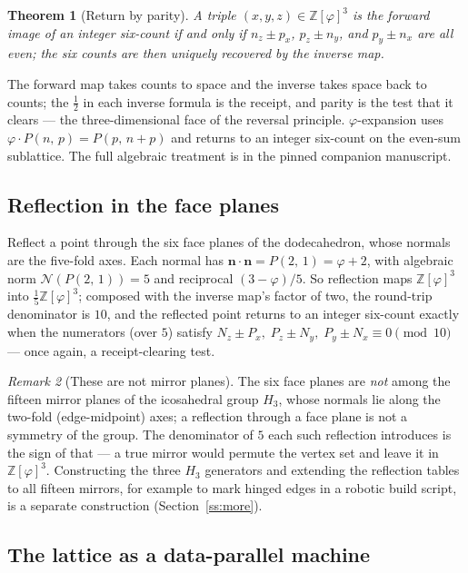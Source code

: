 \documentclass[11pt]{article}
\newtheorem{theorem}{Theorem}[section]
\theoremstyle{definition}
\theoremstyle{remark}
\newtheorem{remark}[theorem]{Remark}
\newcommand{\Zphi}{\mathbb{Z}[\varphi]}
\newcommand{\Pb}[2]{P(#1,\,#2)}
\newcommand{\Norm}{\mathcal{N}}
\begin{document}
\begin{theorem}[Return by parity]
\label{thm:parity}
A triple $(x,y,z)\in\Zphi^3$ is the forward image of an integer six-count if and
only if $n_z\pm p_x$, $p_z\pm n_y$, and $p_y\pm n_x$ are all even; the six counts
are then uniquely recovered by the inverse map.
\end{theorem}

The forward map takes counts to space and the inverse takes space back to counts;
the $\tfrac12$ in each inverse formula is the receipt, and parity is the test that
it clears --- the three-dimensional face of the reversal principle.
$\varphi$-expansion uses $\varphi\cdot\Pb{n}{p}=\Pb{p}{n+p}$ and returns to an
integer six-count on the even-sum sublattice. The full algebraic treatment is in
the pinned companion manuscript.

\subsection{Reflection in the face planes}
\label{ss:reflect}

Reflect a point through the six face planes of the dodecahedron, whose normals
are the five-fold axes. Each normal has $\mathbf n\cdot\mathbf n=\Pb{2}{1}
=\varphi+2$, with algebraic norm $\Norm(\Pb{2}{1})=5$ and reciprocal
$(3-\varphi)/5$. So reflection maps $\Zphi^3$ into $\tfrac15\Zphi^3$; composed
with the inverse map's factor of two, the round-trip denominator is $10$, and the
reflected point returns to an integer six-count exactly when the numerators (over
$5$) satisfy $N_z\pm P_x,\;P_z\pm N_y,\;P_y\pm N_x\equiv0\pmod{10}$ --- once
again, a receipt-clearing test.

\begin{remark}[These are not mirror planes]
\label{rem:notmirror}
The six face planes are \emph{not} among the fifteen mirror planes of the
icosahedral group $H_3$, whose normals lie along the two-fold (edge-midpoint)
axes; a reflection through a face plane is not a symmetry of the group. The
denominator of $5$ each such reflection introduces is the sign of that --- a true
mirror would permute the vertex set and leave it in $\Zphi^3$. Constructing the
three $H_3$ generators and extending the reflection tables to all fifteen
mirrors, for example to mark hinged edges in a robotic build script, is a
separate construction (Section~\ref{ss:more}).
\end{remark}

\subsection{The lattice as a data-parallel machine}
\label{ss:gpu}
\end{document}
